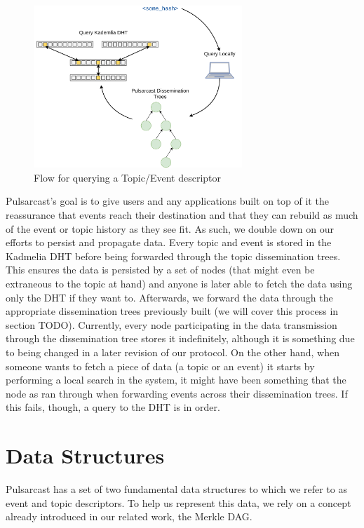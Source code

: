 \begin{figure}[hb!]
  \centering
  \includegraphics[width=0.7\textwidth]{img/pulsarcast-descriptor-query.png}
  \caption{Flow for querying a Topic/Event descriptor}
  \label{fig:pulsarcast-descriptor-query}
\end{figure}

Pulsarcast's goal is to give users and any applications built on top of it the
reassurance that events reach their destination and that they can rebuild as
much of the event or topic history as they see fit. As such, we double down on
our efforts to persist and propagate data. Every topic and event is stored in
the Kadmelia DHT before being forwarded through the topic dissemination trees.
This ensures the data is persisted by a set of nodes (that might even be
extraneous to the topic at hand) and anyone is later able to fetch the data
using only the DHT if they want to. Afterwards, we forward the data through the
appropriate dissemination trees previously built (we will cover this process in
section TODO). Currently, every node participating in the data transmission
through the dissemination tree stores it indefinitely, although it is something
due to being changed in a later revision of our protocol. On the other hand,
when someone wants to fetch a piece of data (a topic or an event) it starts by
performing a local search in the system, it might have been something that the
node as ran through when forwarding events across their dissemination trees. If
this fails, though, a query to the DHT is in order.

\section{Data Structures}\label{data-structures}

Pulsarcast has a set of two fundamental data structures to which we refer to as
event and topic descriptors. To help us represent this data, we rely on a
concept already introduced in our related work, the Merkle DAG.

